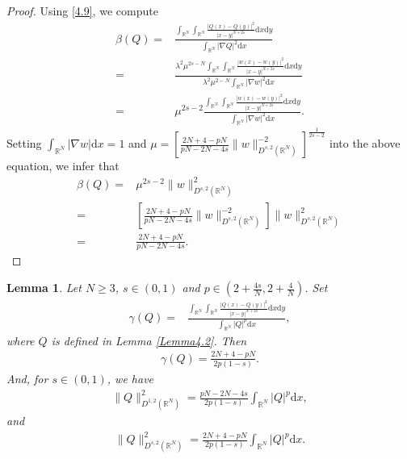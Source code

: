 \documentclass[12pt,a4paper,reqno]{amsart}
\numberwithin{equation}{section}
\newtheorem{lemma}{Lemma}[section]
\begin{document}
\begin{proof}
Using \eqref{4.9}, we compute
\begin{equation*}
\begin{aligned}
\beta(Q)
=&\frac{\int_{\mathbb{R}^{N}}\int_{\mathbb{R}^{N}}\frac{|Q(x)-Q(y)|^{2}}{|x-y|^{N+2s}}\mathrm{d}x\mathrm{d}y}
{\int_{\mathbb{R}^{N}}|\nabla Q|^{2}\mathrm{d}x}\\
=&\frac{\lambda^{2}
\mu^{2s-N}\int_{\mathbb{R}^{N}}\int_{\mathbb{R}^{N}}\frac{|w(x)-w(y)|^{2}}{|x-y|^{N+2s}}\mathrm{d}x\mathrm{d}y}
{\lambda^{2}
\mu^{2-N} \int_{\mathbb{R}^{N}}|\nabla w|^{2}\mathrm{d}x}\\
=&
\mu^{2s-2}
\frac{\int_{\mathbb{R}^{N}}\int_{\mathbb{R}^{N}}\frac{|w(x)-w(y)|^{2}}{|x-y|^{N+2s}}\mathrm{d}x\mathrm{d}y}
{\int_{\mathbb{R}^{N}}|\nabla w|^{2}\mathrm{d}x}.
\end{aligned}
\end{equation*}
Setting $\int_{\mathbb{R}^{N}}|\nabla w|\mathrm{d}x=1$ and $\mu=\left[\frac{2N+4-pN}{pN-2N-4s}
\|w\|_{D^{s,2}(\mathbb{R}^{N})}^{-2}
\right]^{\frac{1}{2s-2}}$ into the above equation, we infer that
\begin{equation*}
\begin{aligned}
\beta(Q)
=&
\mu^{2s-2}
\|w\|_{D^{s,2}(\mathbb{R}^{N})}^{2}\\
=&
\left[\frac{2N+4-pN}{pN-2N-4s}
\|w\|_{D^{s,2}(\mathbb{R}^{N})}^{-2}
\right]
\|w\|_{D^{s,2}(\mathbb{R}^{N})}^{2}\\
=&\frac{2N+4-pN}{pN-2N-4s}.
\end{aligned}
\end{equation*}
\end{proof}

\begin{lemma}\label{Lemma5.2}
Let $N\geqslant 3$, $s\in(0,1)$ and $p \in(2+\frac{4s}{N},2+\frac{4}{N})$.
Set
\begin{equation*}
\begin{aligned}
\gamma(Q)
=&\frac{\int_{\mathbb{R}^{N}}\int_{\mathbb{R}^{N}}\frac{|Q(x)-Q(y)|^{2}}{|x-y|^{N+2s}}\mathrm{d}x\mathrm{d}y}
{\int_{\mathbb{R}^{N}}|Q|^{p}\mathrm{d}x},
\end{aligned}
\end{equation*}
where $Q$ is defined in Lemma \ref{Lemma4.2}.
Then
\begin{equation*}
\begin{aligned}
\gamma(Q)=\frac{2N+4-pN}{2p(1-s)}.
\end{aligned}
\end{equation*}
And,
for $s\in(0,1)$, we have
\begin{equation*}
\begin{aligned}
\|Q\|^{2}_{D^{1,2}(\mathbb{R}^{N})}
=\frac{pN-2N-4s}{2p(1-s)}\int_{\mathbb{R}^{N}}|Q|^{p}\mathrm{d}x,
\end{aligned}
\end{equation*}
and
\begin{equation*}
\begin{aligned}
\|Q\|^{2}_{D^{s,2}(\mathbb{R}^{N})}
=\frac{2N+4-pN}{2p(1-s)}
\int_{\mathbb{R}^{N}}|Q|^{p}\mathrm{d}x.
\end{aligned}
\end{equation*}
\end{lemma}
\end{document}
